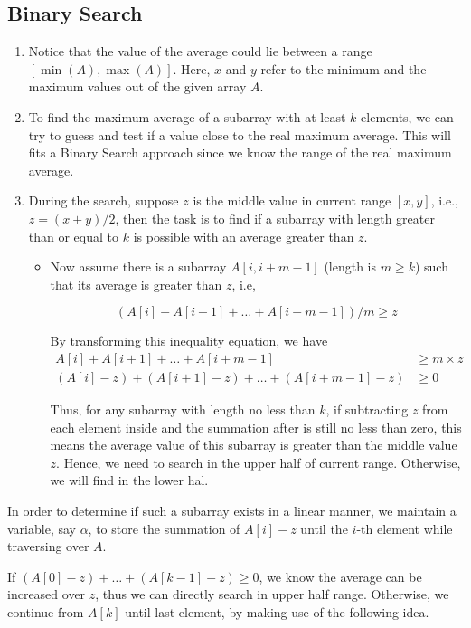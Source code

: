 \subsection{Binary Search}
\begin{enumerate}
\item Notice that the value of the average could lie between a range $[\min(A),\max(A)]$. Here, $x$ and $y$ refer to the minimum and the maximum values out of the given array $A$. \item To find the maximum average of a subarray with at least $k$ elements, we can try to guess and test if a value close to the real maximum average. This will fits a Binary Search approach since we know the range of the real maximum average.
\item During the search, suppose $z$ is the middle value in current range $[x,y]$, i.e., $z=(x+y)/2$, then the task is to find if a subarray with length greater than or equal to $k$ is possible with an average greater than $z$.
\begin{itemize}
\item Now assume there is a subarray $A[i, i+m-1]$ (length is $m\geq k$) such that its average is greater than $z$, i.e, 

$$(A[i] + A[i+1] + \ldots +A[i+m-1])/ m \geq z$$

By transforming this inequality equation, we have 
\begin{align*}
A[i] + A[i+1] + \ldots +A[i+m-1] & \geq m\times z \\
(A[i] - z) + (A[i+1]-z) + \ldots + (A[i+m-1]-z) &\geq 0
\end{align*} 

Thus, for any subarray with length no less than $k$, if subtracting $z$ from each element inside and the summation after is still no less than zero, this means the average value of this subarray is greater than the middle value $z$. Hence, we need to search in the upper half of current range. Otherwise, we will find in the lower hal.
\end{itemize}

\end{enumerate}

In order to determine if such a subarray exists in a linear manner, we maintain a variable, say $\alpha$, to store the summation of $A[i]-z$ until the $i$-th element while traversing over $A$. 

If $(A[0]-z) +\ldots +(A[k-1]-z)\geq 0$, we know the average can be increased over $z$, thus we can directly search in upper half range. Otherwise, we continue from  $A[k]$ until last element, by making use of the following idea.

